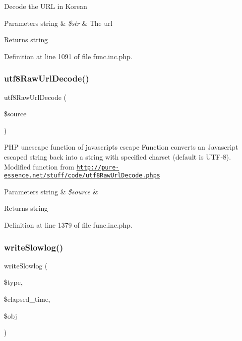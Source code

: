 Decode the U\+RL in Korean


\begin{DoxyParams}[1]{Parameters}
string & {\em \$str} & The url \\
\hline
\end{DoxyParams}
\begin{DoxyReturn}{Returns}
string 
\end{DoxyReturn}


Definition at line 1091 of file func.\+inc.\+php.

\mbox{\label{func_8inc_8php_af1649820887f052ce1f1c9ca623f2db3}} 
\subsubsection{\texorpdfstring{utf8\+Raw\+Url\+Decode()}{utf8RawUrlDecode()}}
{\footnotesize\ttfamily utf8\+Raw\+Url\+Decode (\begin{DoxyParamCaption}\item[{}]{\$source }\end{DoxyParamCaption})}

P\+HP unescape function of javascript\textquotesingle{}s escape Function converts an Javascript escaped string back into a string with specified charset (default is U\+T\+F-\/8). Modified function from \href{http://pure-essence.net/stuff/code/utf8RawUrlDecode.phps}{\tt http\+://pure-\/essence.\+net/stuff/code/utf8\+Raw\+Url\+Decode.\+phps}


\begin{DoxyParams}[1]{Parameters}
string & {\em \$source} & \\
\hline
\end{DoxyParams}
\begin{DoxyReturn}{Returns}
string 
\end{DoxyReturn}


Definition at line 1379 of file func.\+inc.\+php.

\mbox{\label{func_8inc_8php_ad04b6facc446291dbbb292553250a4a6}} 
\subsubsection{\texorpdfstring{write\+Slowlog()}{writeSlowlog()}}
{\footnotesize\ttfamily write\+Slowlog (\begin{DoxyParamCaption}\item[{}]{\$type,  }\item[{}]{\$elapsed\+\_\+time,  }\item[{}]{\$obj }\end{DoxyParamCaption})}


